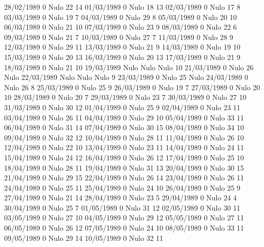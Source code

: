 28/02/1989  0     Nulo    22     14 
01/03/1989  0     Nulo    18     13 
02/03/1989  0     Nulo    17     8 
03/03/1989  0     Nulo    19     7 
04/03/1989  0     Nulo    29     8 
05/03/1989  0     Nulo    20     10 
06/03/1989  0     Nulo    21     10 
07/03/1989  0     Nulo    23     9 
08/03/1989  0     Nulo    22     6 
09/03/1989  0     Nulo    21     7 
10/03/1989  0     Nulo    27     7 
11/03/1989  0     Nulo    28     9 
12/03/1989  0     Nulo    29     11 
13/03/1989  0     Nulo    21     9 
14/03/1989  0     Nulo    19     10 
15/03/1989  0     Nulo    20     13 
16/03/1989  0     Nulo    20     13 
17/03/1989  0     Nulo    21     9 
18/03/1989  0     Nulo    21     10 
19/03/1989 Nulo   Nulo   Nulo    10 
21/03/1989  0     Nulo    26    Nulo
22/03/1989 Nulo   Nulo   Nulo    9 
23/03/1989  0     Nulo    25    Nulo
24/03/1989  0     Nulo    26     8 
25/03/1989  0     Nulo    25     9 
26/03/1989  0     Nulo    19     7 
27/03/1989  0     Nulo    20     10 
28/03/1989  0     Nulo    20     7 
29/03/1989  0     Nulo    23     7 
30/03/1989  0     Nulo    27     10 
31/03/1989  0     Nulo    30     12 
01/04/1989  0     Nulo    25     9 
02/04/1989  0     Nulo    23     11 
03/04/1989  0     Nulo    26     11 
04/04/1989  0     Nulo    29     10 
05/04/1989  0     Nulo    33     11 
06/04/1989  0     Nulo    31     14 
07/04/1989  0     Nulo    30     15 
08/04/1989  0     Nulo    34     10 
09/04/1989  0     Nulo    32     12 
10/04/1989  0     Nulo    28     11 
11/04/1989  0     Nulo    26     10 
12/04/1989  0     Nulo    22     10 
13/04/1989  0     Nulo    23     11 
14/04/1989  0     Nulo    24     11 
15/04/1989  0     Nulo    24     12 
16/04/1989  0     Nulo    26     12 
17/04/1989  0     Nulo    25     10 
18/04/1989  0     Nulo    28     11 
19/04/1989  0     Nulo    31     13 
20/04/1989  0     Nulo    30     15 
21/04/1989  0     Nulo    29     15 
22/04/1989  0     Nulo    26     14 
23/04/1989  0     Nulo    26     11 
24/04/1989  0     Nulo    25     11 
25/04/1989  0     Nulo    24     10 
26/04/1989  0     Nulo    25     9 
27/04/1989  0     Nulo    21     14 
28/04/1989  0     Nulo    23     5 
29/04/1989  0     Nulo    24     4 
30/04/1989  0     Nulo    25     7 
01/05/1989  0     Nulo    31     12 
02/05/1989  0     Nulo    30     11 
03/05/1989  0     Nulo    27     10 
04/05/1989  0     Nulo    29     12 
05/05/1989  0     Nulo    27     11 
06/05/1989  0     Nulo    26     12 
07/05/1989  0     Nulo    24     10 
08/05/1989  0     Nulo    33     11 
09/05/1989  0     Nulo    29     14 
10/05/1989  0     Nulo    32     11 
